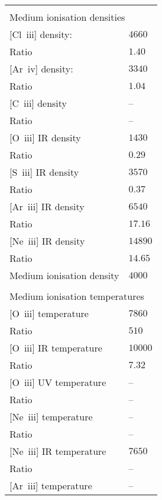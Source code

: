 \begin{longtable}[l]{ll}
 \vspace{0.2cm}\\\multicolumn{2}{l}{Medium ionisation densities}\\ \hline
 {}[Cl~{\sc iii}] density:           & $ 4660$\\
 Ratio                               & $  1.40$\\
 {}[Ar~{\sc iv}] density:            & $ 3340$\\
 Ratio                               & $  1.04$\\
 {}[C~{\sc iii}] density             & -- \\
 Ratio                               & -- \\
 {}[O~{\sc iii}] IR density          & $ 1430$\\
 Ratio                               & $  0.29$\\
 {}[S~{\sc iii}] IR density          & $ 3570$\\
 Ratio                               & $  0.37$\\
 {}[Ar~{\sc iii}] IR density         & $ 6540$\\
 Ratio                               & $ 17.16$\\
 {}[Ne~{\sc iii}] IR density         & $14890$\\
 Ratio                               & $ 14.65$\\
 Medium ionisation density           & $ 4000$\\
 \vspace{0.2cm}\\\multicolumn{2}{l}{Medium ionisation temperatures}\\ \hline
 {}[O~{\sc iii}] temperature         & $ 7860$\\
 Ratio                               & $  510$\\
 {}[O~{\sc iii}] IR temperature      & $10000$\\
 Ratio                               & $  7.32$\\
 {}[O~{\sc iii}] UV temperature      & -- \\
 Ratio                               & -- \\
 {}[Ne~{\sc iii}] temperature        & -- \\
 Ratio                               & -- \\
 {}[Ne~{\sc iii}] IR temperature     & $ 7650$\\
 Ratio                               & -- \\
 {}[Ar~{\sc iii}] temperature        & -- \\

\end{longtable}
